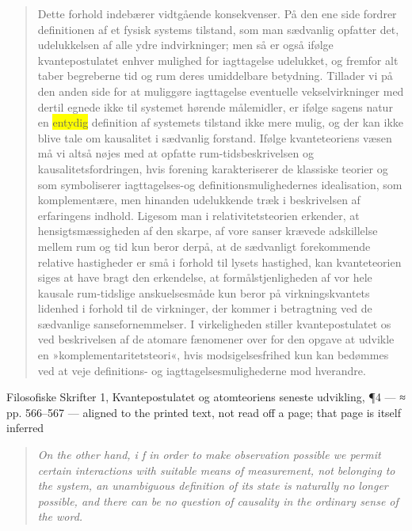 \documentclass[11pt]{article}
\newcommand{\dcite}[1]{{\nopagebreak\raggedleft\small #1\par}\medskip}
\newcommand{\tlg}[1]{{\setlength{\fboxsep}{0.8pt}\colorbox{yellow}{#1}}}
\newcommand{\olg}[1]{{\setlength{\fboxsep}{0.8pt}\colorbox{cyan!25}{#1}}}
\begin{document}
\begin{quote}
Dette forhold indebærer vidtgående konsekvenser. På den ene side fordrer definitionen af et fysisk systems tilstand, som man sædvanlig opfatter det, udelukkelsen af alle ydre indvirkninger; men så er også ifølge kvantepostulatet enhver mulighed for iagttagelse udelukket, og fremfor alt taber begreberne tid og rum deres umiddelbare betydning. Tillader vi på den anden side for at muliggøre iagttagelse eventuelle vekselvirkninger med dertil egnede ikke til systemet hørende målemidler, er ifølge sagens natur en \tlg{entydig} definition af systemets tilstand ikke mere mulig, og der kan ikke blive tale om kausalitet i sædvanlig forstand. Ifølge kvanteteoriens væsen må vi altså nøjes med at opfatte rum-tidsbeskrivelsen og kausalitetsfordringen, hvis forening karakteriserer de klassiske teorier og som symboliserer iagttagelses-og definitionsmulighedernes idealisation, som komplementære, men hinanden udelukkende træk i beskrivelsen af erfaringens indhold. Ligesom man i relativitetsteorien erkender, at hensigtsmæssigheden af den skarpe, af vore sanser krævede adskillelse mellem rum og tid kun beror derpå, at de sædvanligt forekommende relative hastigheder er små i forhold til lysets hastighed, kan kvanteteorien siges at have bragt den erkendelse, at formålstjenligheden af vor hele kausale rum-tidslige anskuelsesmåde kun beror på virkningskvantets lidenhed i forhold til de virkninger, der kommer i betragtning ved de sædvanlige sansefornemmelser. I virkeligheden stiller kvantepostulatet os ved beskrivelsen af de atomare fænomener over for den opgave at udvikle en »komplementaritetsteori«, hvis modsigelsesfrihed kun kan bedømmes ved at veje definitions- og iagttagelsesmulighederne mod hverandre.
\end{quote}
\dcite{Filosofiske Skrifter 1, Kvantepostulatet og atomteoriens seneste udvikling, ¶4 — ≈ pp. 566–567 — aligned to the printed text, not read off a page; that page is itself inferred}
{\footnotesize\begin{quote}\itshape
On the other hand, i f in order to make observation possible we permit certain interactions with suitable means of measurement, not belonging to the system, an \olg{unambiguous} definition of its state is naturally no longer possible, and there can be no question of causality in the ordinary sense of the word.
\end{quote}}
\end{document}
